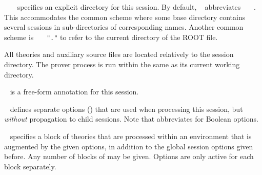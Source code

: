 \begin{isabellebody}
\begin{isamarkuptext}
\begin{description}
  \item {}~~~
  specifies an explicit directory for this session.  By default,
  ~ abbreviates
  ~~~.  This
  accommodates the common scheme where some base directory contains
  several sessions in sub-directories of corresponding names.  Another
  common scheme is ~~~\verb|"."| to refer to the current
  directory of the ROOT file.

  All theories and auxiliary source files are located relatively to
  the session directory.  The prover process is run within the same as
  its current working directory.

  \item {}~ is a free-form
  annotation for this session.

  \item {}~ defines
  separate options () that are used when
  processing this session, but \emph{without} propagation to child
  sessions.  Note that  abbreviates  for
  Boolean options.

  \item {}~ specifies a
  block of theories that are processed within an environment that is
  augmented by the given options, in addition to the global session
  options given before.  Any number of blocks of 
  may be given.  Options are only active for each
   block separately.


\end{description}
\end{isamarkuptext}
\end{isabellebody}
